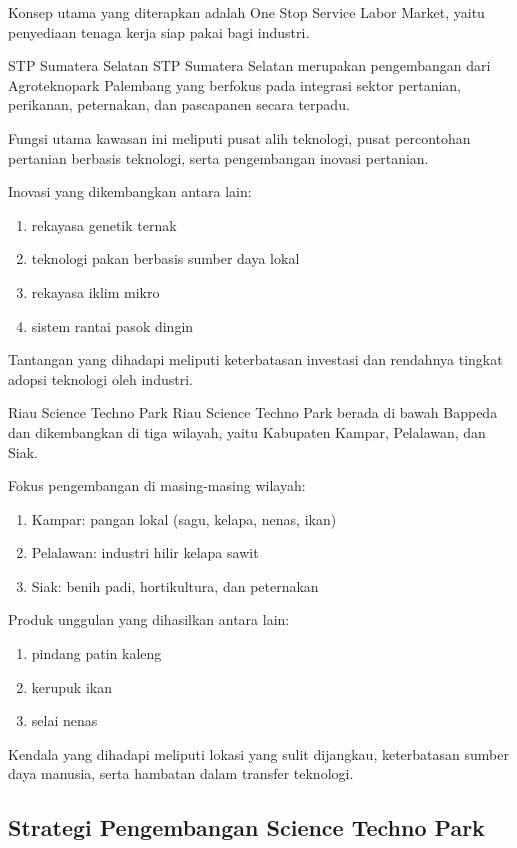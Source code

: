 \documentclass[../wastek.tex]{subfiles}
\begin{document}
Konsep utama yang diterapkan adalah One Stop Service Labor Market, yaitu penyediaan tenaga kerja siap pakai bagi industri.

\tabitem STP Sumatera Selatan
STP Sumatera Selatan merupakan pengembangan dari Agroteknopark Palembang yang berfokus pada integrasi sektor pertanian, perikanan, peternakan, dan pascapanen secara terpadu.

Fungsi utama kawasan ini meliputi pusat alih teknologi, pusat percontohan pertanian berbasis teknologi, serta pengembangan inovasi pertanian.

Inovasi yang dikembangkan antara lain:
\begin{enumerate}
	\item rekayasa genetik ternak
	\item teknologi pakan berbasis sumber daya lokal
	\item rekayasa iklim mikro
	\item sistem rantai pasok dingin
\end{enumerate}

Tantangan yang dihadapi meliputi keterbatasan investasi dan rendahnya tingkat adopsi teknologi oleh industri.

\tabitem Riau Science Techno Park
Riau Science Techno Park berada di bawah Bappeda dan dikembangkan di tiga wilayah, yaitu Kabupaten Kampar, Pelalawan, dan Siak.

Fokus pengembangan di masing-masing wilayah:
\begin{enumerate}
	\item Kampar: pangan lokal (sagu, kelapa, nenas, ikan)
	\item Pelalawan: industri hilir kelapa sawit
	\item Siak: benih padi, hortikultura, dan peternakan
\end{enumerate}

Produk unggulan yang dihasilkan antara lain:
\begin{enumerate}
	\item pindang patin kaleng
	\item kerupuk ikan
	\item selai nenas
\end{enumerate}

Kendala yang dihadapi meliputi lokasi yang sulit dijangkau, keterbatasan sumber daya manusia, serta hambatan dalam transfer teknologi.

\subsection{Strategi Pengembangan Science Techno Park}%
\label{sub:strategi_pengembangan_science_techno_park}
\end{document}
